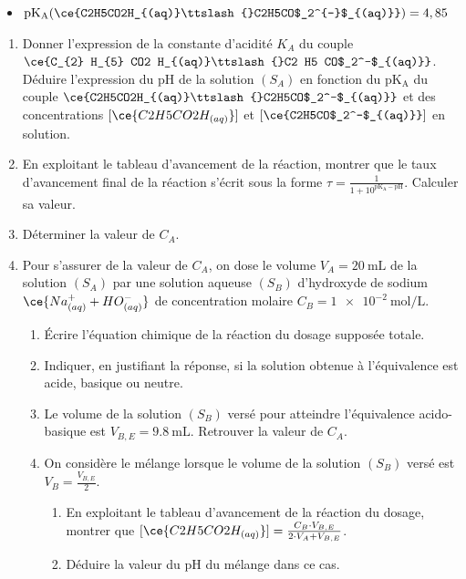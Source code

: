 \begin{donnees}
    \begin{itemize}
        \item $\mathrm{pK_A}
              (\ce{C2H5CO2H_{(aq)}\ttslash{}C2H5CO$_2^{-}$_{(aq)}})=4,85$
    \end{itemize}
\end{donnees}
\begin{enumerate}
    \item Donner l'expression de la constante d'acidité $K_{A}$ du couple
          $\ce{C_{2} H_{5} CO2 H_{(aq)}\ttslash{}C2 H5 CO$_2^-$_{(aq)}}$.
          Déduire l'expression du $\mathrm{pH}$ de la solution $(S_{A})$ en
          fonction du $\mathrm{pK_{A}}$ du couple
          $\ce{C2H5CO2H_{(aq)}\ttslash{}C2H5CO$_2^-$_{(aq)}}$ et des
          concentrations $[\ce{C2H5CO2H_{(aq)}}]$ et
          $[\ce{C2H5CO$_2^-$_{(aq)}}]$ en solution.
    \item En exploitant le tableau d'avancement de la réaction, montrer que le
          taux d'avancement final de la réaction s'écrit sous la forme
          $\tau=\frac{1}{1+10^{\mathrm{pK_{A}}-\mathrm{pH}}}$. Calculer sa
          valeur.
    \item Déterminer la valeur de $C_{A}$.
    \item Pour s'assurer de la valeur de $C_{A}$, on dose le volume
          $V_{A}=\qty{20}{\mL}$ de la solution $(S_{A})$ par une solution
          aqueuse $(S_{B})$ d'hydroxyde de sodium
          $\ce{Na^+_{(aq)} + HO^-_{(aq)}}$ de concentration molaire
          $C_{B}=\qty{1e-2}{\mole\per\L}$.
          \begin{enumerate}
              \item Écrire l'équation chimique de la réaction du dosage supposée
                    totale.
              \item Indiquer, en justifiant la réponse, si la solution obtenue à
                    l'équivalence est acide, basique ou neutre.
              \item Le volume de la solution $(S_{B})$ versé pour atteindre
                    l'équivalence acido-basique est $V_{B,E}=\qty{9,8}{\mL}$.
                    Retrouver la valeur de $C_{A}$.
              \item On considère le mélange lorsque le volume de la solution
                    $\left(S_{B}\right)$ versé est $V_{B}=\frac{V_{B, E}}{2}$.
                    \begin{enumerate}
                        \item En exploitant le tableau d’avancement de la
                              réaction du dosage, montrer que
                              $[\ce{C2H5CO2H_{(aq)}}]=
                              \frac{C_B\cdot V_{B,E}}{2\cdot V_{A}+V_{B,E}}$.
                        \item Déduire la valeur du $\mathrm{pH}$ du mélange dans
                              ce cas.
                    \end{enumerate}
          \end{enumerate}
\end{enumerate}

